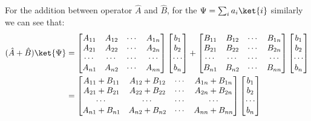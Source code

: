 For the addition between operator $\hat{A}$ and $\hat{B}$, for the
$\Psi=\sum_{i}a_{i}\ket{i}$ similarly we can see that:
\begin{align}\label{REPRESENTATIONeq:7}
(\hat{A}+\hat{B})\ket{\Psi} &= \begin{bmatrix}
     A_{11} & A_{12} & \cdots & A_{1n} \\
     A_{21} & A_{22} & \cdots & A_{2n} \\
     \cdots & \cdots & \cdots & \cdots \\
     A_{n1} & A_{n2} & \cdots & A_{nn} \\
   \end{bmatrix}
\begin{bmatrix}
  b_{1} \\
  b_{2} \\
  \cdots \\
  b_{n} \\
\end{bmatrix} +
\begin{bmatrix}
     B_{11} & B_{12} & \cdots & B_{1n} \\
     B_{21} & B_{22} & \cdots & B_{2n} \\
     \cdots & \cdots & \cdots & \cdots \\
     B_{n1} & B_{n2} & \cdots & B_{nn} \\
   \end{bmatrix}
\begin{bmatrix}
  b_{1} \\
  b_{2} \\
  \cdots \\
  b_{n} \\
\end{bmatrix} \nonumber \\
& = \begin{bmatrix}
     A_{11} + B_{11} & A_{12}+B_{12} & \cdots & A_{1n}+B_{1n} \\
     A_{21} + B_{21} & A_{22}+B_{22} & \cdots & A_{2n}+B_{2n} \\
     \cdots & \cdots & \cdots & \cdots \\
     A_{n1} + B_{n1} & A_{n2}+B_{n2} & \cdots & A_{nn}+B_{nn} \\
   \end{bmatrix}
\begin{bmatrix}
  b_{1} \\
  b_{2} \\
  \cdots \\
  b_{n} \\
\end{bmatrix}
\end{align}

